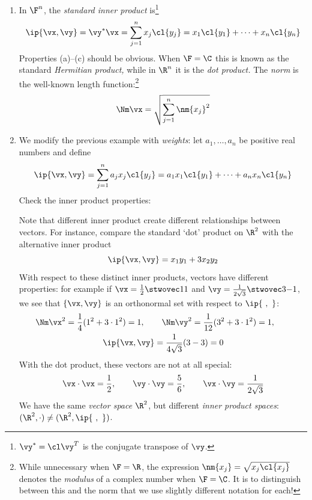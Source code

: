 \begin{examples}\label{exs:ipstds}
\begin{enumerate}
  \item In $\F^n$, the \emph{standard inner product} is\footnote{$\vy^*=\cl\vy^T$ is the conjugate transpose of $\vy$.}
	\[\ip{\vx,\vy}=\vy^*\vx=\sum_{j=1}^nx_j\cl{y_j}=x_1\cl{y_1}+\cdots+x_n\cl{y_n}\]
	Properties (a)--(c) should be obvious. When $\F=\C$ this is known as the standard \emph{Hermitian product,} while in $\R^n$ it is the \emph{dot product.} The \emph{norm} is the well-known length function:\footnote{While unnecessary when $\F=\R$, the expression $\nm{x_j}=\sqrt{x_j\cl{x_j}}$ denotes the \emph{modulus} of a complex number when $\F=\C$. It is to distinguish between this and the norm that we use slightly different notation for each!}
	\[\Nm\vx=\sqrt{\sum_{j=1}^n\nm{x_j}^2}\]
	\item\label{ex:ip:std2} We modify the previous example with \emph{weights}: let $a_1,\ldots,a_n$ be positive real numbers and define
  \[\ip{\vx,\vy}=\sum_{j=1}^na_jx_j\cl{y_j}=a_1x_1\cl{y_1}+\cdots+a_nx_n\cl{y_n}\]
  Check the inner product properties:
  Note that different inner product create different relationships between vectors. For instance, compare the standard `dot' product on $\R^2$ with the alternative inner product
  \[\ip{\vx,\vy}=x_1y_1+3x_2y_2\]
  With respect to these distinct inner products, vectors have different properties: for example if $\vx=\frac 12\stwovec 11$ and $\vy=\frac 1{2\sqrt{3}}\stwovec 3{-1}$, we see that $\{\vx,\vy\}$ is an orthonormal set with respect to $\ip{\ ,\ }$:
  \begin{gather*}
  \Nm\vx^2=\frac 14(1^2+3\cdot 1^2)=1,\qquad \Nm\vy^2=\frac 1{12}(3^2+3\cdot 1^2)=1,\qquad\\\ip{\vx,\vy}=\frac 1{4\sqrt 3}(3-3)=0
  \end{gather*}
  With the dot product, these vectors are not at all special:
  \[\vx\cdot\vx=\frac 12,\qquad \vy\cdot\vy=\frac 56,\qquad \vx\cdot \vy=\frac 1{2\sqrt 3}\]
  We have the same \emph{vector space} $\R^2$, but different \emph{inner product spaces}: $(\R^2,\cdot)\neq(\R^2,\ip{\ ,\ })$.
\end{enumerate}
\end{examples}%

